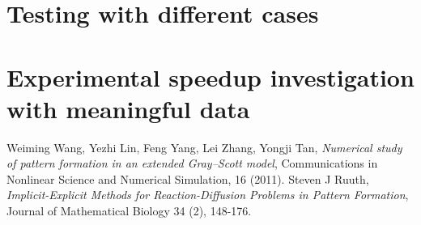 \documentclass[a4paper,11pt]{article}
\begin{document}
\section*{Testing with different cases}
\section*{Experimental speedup investigation with meaningful data}

\begin{thebibliography}{}
 Weiming Wang, Yezhi Lin, Feng Yang, Lei Zhang, Yongji Tan, {\it Numerical study of pattern formation in an extended Gray–Scott model}, Communications in Nonlinear Science and Numerical Simulation, 16 (2011).
 Steven J Ruuth, {\it Implicit-Explicit Methods for Reaction-Diffusion Problems in Pattern Formation}, Journal of Mathematical Biology 34 (2), 148-176. 
\end{thebibliography}
\end{document}
